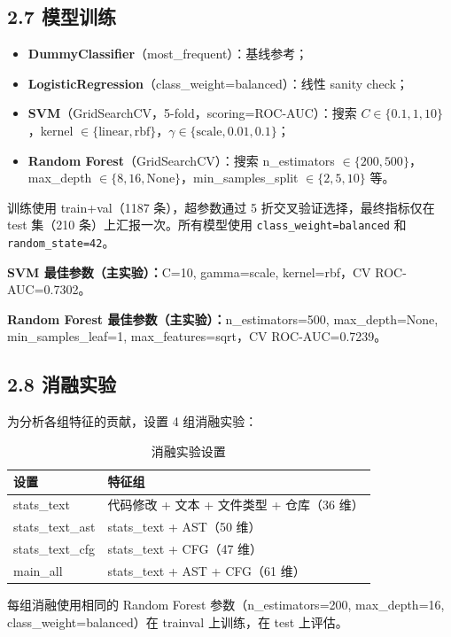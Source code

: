 \documentclass{experimentreport}
\begin{document}
{\subsection*{2.7 模型训练}

\begin{itemize}
    \item \textbf{DummyClassifier}（most\_frequent）：基线参考；
    \item \textbf{LogisticRegression}（class\_weight=balanced）：线性 sanity check；
    \item \textbf{SVM}（GridSearchCV，5-fold，scoring=ROC-AUC）：搜索 $C \in \{0.1,1,10\}$，kernel $\in \{\text{linear},\text{rbf}\}$，$\gamma \in \{\text{scale},0.01,0.1\}$；
    \item \textbf{Random Forest}（GridSearchCV）：搜索 n\_estimators $\in \{200,500\}$，max\_depth $\in \{8,16,\text{None}\}$，min\_samples\_split $\in \{2,5,10\}$ 等。
\end{itemize}

训练使用 train+val（1187 条），超参数通过 5 折交叉验证选择，最终指标仅在 test 集（210 条）上汇报一次。所有模型使用 \texttt{class\_weight=balanced} 和 \texttt{random\_state=42}。

\textbf{SVM 最佳参数（主实验）：}C=10, gamma=scale, kernel=rbf，CV ROC-AUC=0.7302。

\textbf{Random Forest 最佳参数（主实验）：}n\_estimators=500, max\_depth=None, min\_samples\_leaf=1, max\_features=sqrt，CV ROC-AUC=0.7239。

\subsection*{2.8 消融实验}

为分析各组特征的贡献，设置 4 组消融实验：

\begin{table}[ht]
\centering
\caption{消融实验设置}
\begin{tabular}{|l|l|}
\hline
\textbf{设置} & \textbf{特征组} \\
\hline
stats\_text & 代码修改 + 文本 + 文件类型 + 仓库（36 维） \\
\hline
stats\_text\_ast & stats\_text + AST（50 维） \\
\hline
stats\_text\_cfg & stats\_text + CFG（47 维） \\
\hline
main\_all & stats\_text + AST + CFG（61 维） \\
\hline
\end{tabular}
\end{table}

每组消融使用相同的 Random Forest 参数（n\_estimators=200, max\_depth=16, class\_weight=balanced）在 trainval 上训练，在 test 上评估。

}
\end{document}
